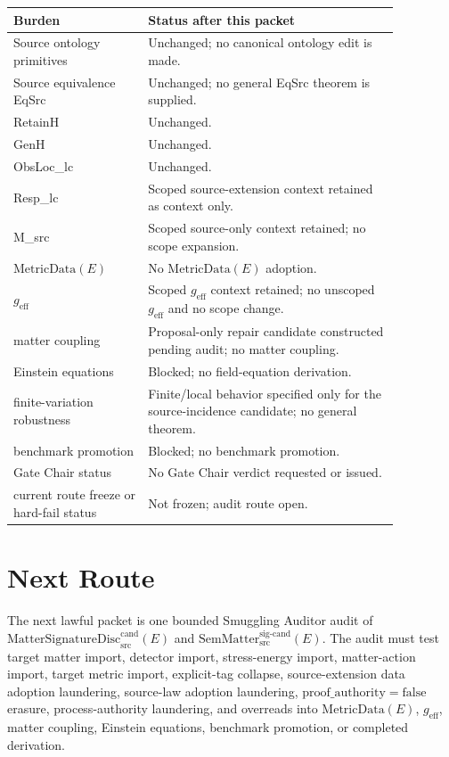 \documentclass[11pt]{article}
\newcommand{\MetricData}{\mathrm{MetricData}}
\newcommand{\geff}{g_{\mathrm{eff}}}
\newcommand{\SemMatterSig}{\mathrm{SemMatter}_{\mathrm{src}}^{\mathrm{sig\text{-}cand}}}
\newcommand{\MatSigDisc}{\mathrm{MatterSignatureDisc}_{\mathrm{src}}^{\mathrm{cand}}}
\newcommand{\ProofAuthFalse}{\mathrm{proof\_authority=false}}
\begin{document}
\begin{longtable}{p{0.30\linewidth}p{0.56\linewidth}}
\toprule
Burden & Status after this packet \\
\midrule
Source ontology primitives & Unchanged; no canonical ontology edit is made. \\
Source equivalence EqSrc & Unchanged; no general EqSrc theorem is supplied. \\
RetainH & Unchanged. \\
GenH & Unchanged. \\
ObsLoc\_lc & Unchanged. \\
Resp\_lc & Scoped source-extension context retained as context only. \\
M\_src & Scoped source-only context retained; no scope expansion. \\
\(\MetricData(E)\) & No \(\MetricData(E)\) adoption. \\
\(\geff\) & Scoped \(\geff\) context retained; no unscoped \(\geff\) and no scope change. \\
matter coupling & Proposal-only repair candidate constructed pending audit; no matter coupling. \\
Einstein equations & Blocked; no field-equation derivation. \\
finite-variation robustness & Finite/local behavior specified only for the source-incidence candidate; no general theorem. \\
benchmark promotion & Blocked; no benchmark promotion. \\
Gate Chair status & No Gate Chair verdict requested or issued. \\
current route freeze or hard-fail status & Not frozen; audit route open. \\
\bottomrule
\end{longtable}

\section{Next Route}

The next lawful packet is one bounded Smuggling Auditor audit of
\(\MatSigDisc(E)\) and \(\SemMatterSig(E)\). The audit must test target matter
import, detector import, stress-energy import, matter-action import, target
metric import, explicit-tag collapse, source-extension data adoption
laundering, source-law adoption laundering, \(\ProofAuthFalse\) erasure,
process-authority laundering, and overreads into \(\MetricData(E)\), \(\geff\),
matter coupling, Einstein equations, benchmark promotion, or completed
derivation.
\end{document}
